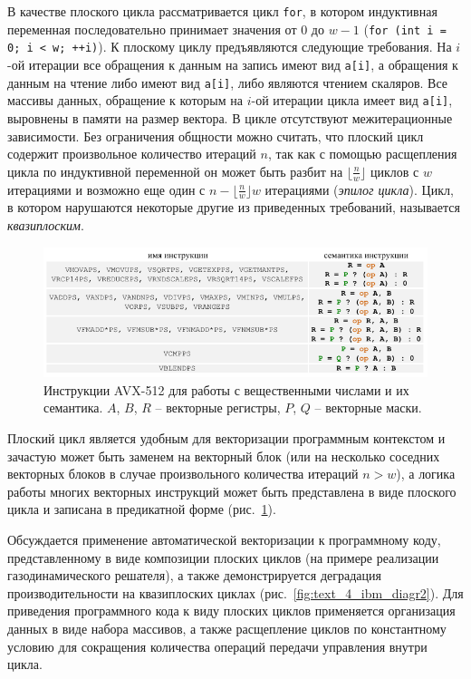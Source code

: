 \documentclass[a4paper,14pt]{extarticle}                     %
\theoremstyle{plain}                                         %
\begin{document}
В качестве плоского цикла рассматривается цикл \texttt{for}, в котором индуктивная переменная последовательно принимает значения от $0$ до $w - 1$ (\texttt{for (int i = 0; i < w; ++i)}).
К плоскому циклу предъявляются следующие требования.
На $i$-ой итерации все обращения к данным на запись имеют вид \texttt{a[i]}, а обращения к данным на чтение либо имеют вид \texttt{a[i]}, либо являются чтением скаляров.
Все массивы данных, обращение к которым на $i$-ой итерации цикла имеет вид \texttt{a[i]}, выровнены в памяти на размер вектора.
В цикле отсутствуют межитерационные зависимости.
Без ограничения общности можно считать, что плоский цикл содержит произвольное количество итераций $n$, так как с помощью расщепления цикла по индуктивной переменной он может быть разбит на $\lfloor \frac{n}{w} \rfloor$ циклов с $w$ итерациями и возможно еще один с $n - \lfloor \frac{n}{w} \rfloor w$ итерациями (\textit{эпилог цикла}).
Цикл, в котором нарушаются некоторые другие из приведенных требований, называется \textit{квазиплоским}.

\begin{figure}[!ht]
\centering
\includegraphics[width=1.0\textwidth]{./fig/vec_avx512_semantic_table.pdf}
\singlespacing
\caption{Инструкции AVX-512 для работы с вещественными числами и их семантика. $A$, $B$, $R$ -- векторные регистры, $P$, $Q$ -- векторные маски.}
\label{fig:vec_avx512_semantic_table}
\end{figure}

Плоский цикл является удобным для векторизации программным контекстом и зачастую может быть заменем на векторный блок (или на несколько соседних векторных блоков в случае произвольного количества итераций $n > w$), а логика работы многих векторных инструкций может быть представлена в виде плоского цикла и записана в предикатной форме (рис.~\ref{fig:vec_avx512_semantic_table}).

Обсуждается применение автоматической векторизации к программному коду, представленному в виде композиции плоских циклов (на примере реализации газодинамического решателя), а также демонстрируется деградация производительности на квазиплоских циклах (рис.~\ref{fig:text_4_ibm_diagr2}).
Для приведения программного кода к виду плоских циклов применяется организация данных в виде набора массивов, а также расщепление циклов по константному условию для сокращения количества операций передачи управления внутри цикла.
\end{document}
